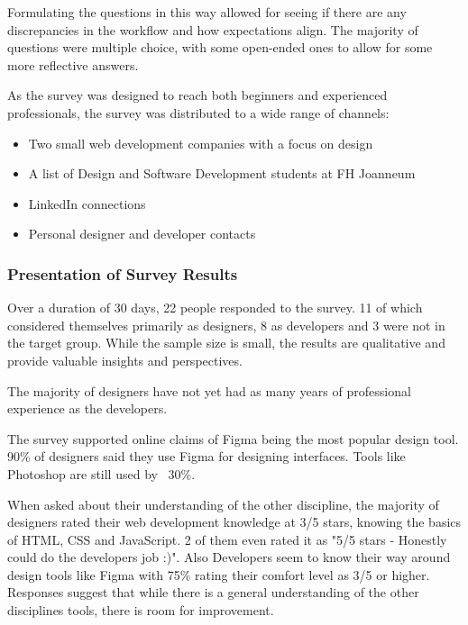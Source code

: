 Formulating the questions in this way allowed for seeing if there are any discrepancies in the
workflow and how expectations align. The majority of questions were multiple choice, with some
open-ended ones to allow for some more reflective answers.

As the survey was designed to reach both beginners and experienced professionals, the survey was
distributed to a wide range of channels:
\begin{itemize}
    \item Two small web development companies with a focus on design
    \item A list of Design and Software Development students at FH Joanneum
    \item LinkedIn connections
    \item Personal designer and developer contacts
\end{itemize}


\subsubsection{Presentation of Survey Results}
Over a duration of 30 days, 22 people responded to the survey. 11 of which considered themselves
primarily as designers, 8 as developers and 3 were not in the target group. While the sample size is
small, the results are qualitative and provide valuable insights and perspectives.

The majority of designers have not yet had as many years of professional experience as the
developers.  %

The survey supported online claims of Figma being the most popular design tool. 90\% of designers
said they use Figma for designing interfaces. Tools like Photoshop are still used by ~30\%.

When asked about their understanding of the other discipline, the majority of designers rated their
web development knowledge at 3/5 stars, knowing the basics of HTML, CSS and JavaScript. 2 of
them even rated it as "5/5 stars - Honestly could do the developers job :)". Also Developers seem to
know their way around design tools like Figma with 75\% rating their comfort level as 3/5 or higher.
Responses suggest that while there is a general understanding of the other disciplines tools, there
is room for improvement.

